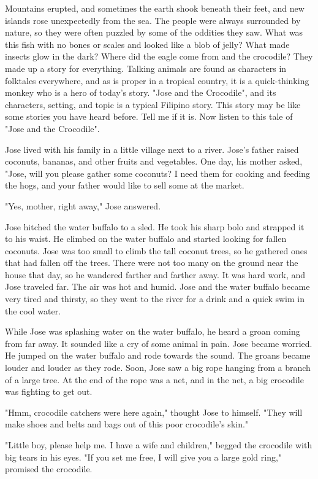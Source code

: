 Mountains erupted, and sometimes the earth shook beneath their feet, and new islands rose unexpectedly from the sea. The people were always surrounded by nature, so they were often puzzled by some of the oddities they saw. What was this fish with no bones or scales and looked like a blob of jelly? What made insects glow in the dark? Where did the eagle come from and the crocodile? They made up a story for everything. Talking animals are found as characters in folktales everywhere, and as is proper in a tropical country, it is a quick-thinking monkey who is a hero of today's story. "Jose and the Crocodile", and its characters, setting, and topic is a typical Filipino story. This story may be like some stories you have heard before. Tell me if it is. Now listen to this tale of "Jose and the Crocodile".

Jose lived with his family in a little village next to a river. Jose's father raised coconuts, bananas, and other fruits and vegetables. One day, his mother asked, "Jose, will you please gather some coconuts? I need them for cooking and feeding the hogs, and your father would like to sell some at the market.

"Yes, mother, right away," Jose answered.

Jose hitched the water buffalo to a sled. He took his sharp bolo and strapped it to his waist. He climbed on the water buffalo and started looking for fallen coconuts. Jose was too small to climb the tall coconut trees, so he gathered ones that had fallen off the trees. There were not too many on the ground near the house that day, so he wandered farther and farther away. It was hard work, and Jose traveled far. The air was hot and humid. Jose and the water buffalo became very tired and thirsty, so they went to the river for a drink and a quick swim in the cool water.

While Jose was splashing water on the water buffalo, he heard a groan coming from far away. It sounded like a cry of some animal in pain. Jose became worried. He jumped on the water buffalo and rode towards the sound. The groans became louder and louder as they rode. Soon, Jose saw a big rope hanging from a branch of a large tree. At the end of the rope was a net, and in the net, a big crocodile was fighting to get out.

"Hmm, crocodile catchers were here again," thought Jose to himself. "They will make shoes and belts and bags out of this poor crocodile's skin."

"Little boy, please help me. I have a wife and children," begged the crocodile with big tears in his eyes. "If you set me free, I will give you a large gold ring," promised the crocodile.

